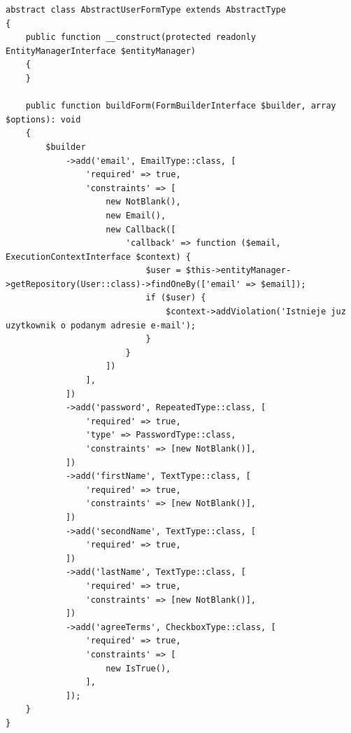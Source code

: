 \documentclass[12pt,oneside]{book}
\begin{document}
    \begin{lstlisting}[caption={Formularz danych rejestracji}, label={lst:example-sdiwpil-form}]
abstract class AbstractUserFormType extends AbstractType
{
    public function __construct(protected readonly EntityManagerInterface $entityManager)
    {
    }

    public function buildForm(FormBuilderInterface $builder, array $options): void
    {
        $builder
            ->add('email', EmailType::class, [
                'required' => true,
                'constraints' => [
                    new NotBlank(),
                    new Email(),
                    new Callback([
                        'callback' => function ($email, ExecutionContextInterface $context) {
                            $user = $this->entityManager->getRepository(User::class)->findOneBy(['email' => $email]);
                            if ($user) {
                                $context->addViolation('Istnieje juz uzytkownik o podanym adresie e-mail');
                            }
                        }
                    ])
                ],
            ])
            ->add('password', RepeatedType::class, [
                'required' => true,
                'type' => PasswordType::class,
                'constraints' => [new NotBlank()],
            ])
            ->add('firstName', TextType::class, [
                'required' => true,
                'constraints' => [new NotBlank()],
            ])
            ->add('secondName', TextType::class, [
                'required' => true,
            ])
            ->add('lastName', TextType::class, [
                'required' => true,
                'constraints' => [new NotBlank()],
            ])
            ->add('agreeTerms', CheckboxType::class, [
                'required' => true,
                'constraints' => [
                    new IsTrue(),
                ],
            ]);
    }
}
    \end{lstlisting}
\end{document}
